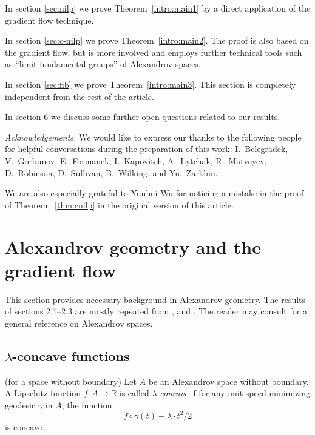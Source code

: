 \documentclass{amsart}
\begin{document}
In section \ref{sec:nilp} we prove Theorem~\ref{intro:main1} by a direct application of the gradient flow technique.

In section \ref{sec:c-nilp} we  prove Theorem~\ref{intro:main2}.
The proof is also based on the gradient flow, but
is more involved and employs further technical tools such as
``limit fundamental groups'' of Alexandrov spaces.

In section \ref{sec:fib} we prove Theorem~\ref{intro:main3}.
This section is completely independent from the rest of the article.

In section 6 we discuss some further open questions related to our results.

\smallskip

{\it Acknowledgements.}
We would like to express our thanks to the following people
for helpful conversations during the preparation of this work:
I.~Belegradek,
V.~Gorbunov, E.~Formanek, I.~Kapovitch, A.~Lytchak, R.~Matveyev, D.~Robinson,
D.~Sullivan,  B.~Wilking, and Yu.~Zarkhin.

We are also especially grateful to Yunhui Wu for noticing a mistake
in the  proof of Theorem ~\ref{thm:cnilp} in the original version of
this article.

\section{ Alexandrov geometry and the gradient flow}\label{s:gradpush}

This section
provides necessary background in Alexandrov geometry.
The results of sections 2.1--2.3 are mostly  repeated from  \cite{PP}, \cite{Ptr2} and \cite{Ptr2007}.
The reader may consult \cite{BGP} for a general reference on Alexandrov spaces.


\subsection{$\lambda$-concave functions}


\begin{defn}(for a space without boundary) Let $A$ be an Alexandrov space without boundary.
A Lipschitz function $f\colon A \rightarrow \mathbb{R}$ is called
$\lambda$-\emph{concave} if for any unit speed minimizing geodesic $\gamma$
in $A$, the function
$$f\circ\gamma(t)-\lambda{\cdot}  t^2/2$$
is concave.
\end{defn}
\end{document}

